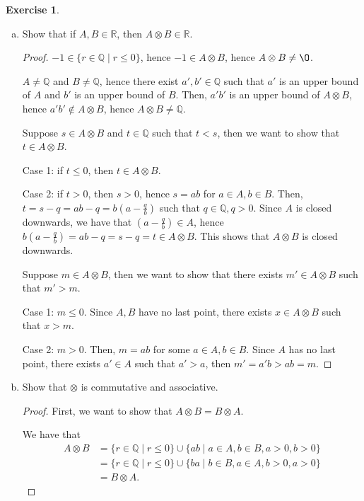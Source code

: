 \documentclass[11pt]{article}
\newcommand{\bbQ}{\mathbb{Q}}
\newcommand{\bbR}{\mathbb{R}}
\renewcommand{\emptyset}{\O}
\theoremstyle{definition}
\newtheorem{exercise}[theorem]{Exercise}
\numberwithin{equation}{subsection}
\begin{document}
\begin{exercise}
	\begin{enumerate}[(a)]
		\item Show that if $A, B \in \bbR$, then $A \otimes B \in \bbR$.
        
\begin{proof}
$-1 \in \{r \in \bbQ \mid r \leq 0\}$, hence $-1 \in A \otimes B$, hence $A \otimes B \neq \emptyset$.

$A\neq \bbQ$ and $B \neq \bbQ$, hence there exist $a',b' \in \bbQ$ such that $a'$ is an upper bound of $A$ and $b'$ is an upper bound of $B$. Then, $a'b'$ is an upper bound of $A \otimes B$, hence $a'b' \notin A \otimes B$, hence $A \otimes B \neq \bbQ$.

Suppose $s \in A \otimes B$ and $t\in \bbQ$ such that $t<s$, then we want to show that $t \in A\otimes B$.

Case 1: if $t\leq0$, then $t\in A \otimes B$.

Case 2: if $t>0$, then $s>0$, hence $s=ab$ for $a\in A, b\in B$. Then, $t=s-q=ab-q=b(a-\frac{q}{b})$ such that $q\in \bbQ, q >0$. Since $A$ is closed downwards, we have that $(a-\frac{q}{b})\in A$, hence $b(a-\frac{q}{b})=ab-q=s-q=t \in A\otimes B$. This shows that $A\otimes B$ is closed downwards.

Suppose $m \in A \otimes B$, then we want to show that there exists $m' \in A\otimes B$ such that $m'>m$.

Case 1: $m\leq 0$. Since $A,B$ have no last point, there exists $x \in A \otimes B$ such that $x>m$. 

Case 2: $m>0$. Then, $m=ab$ for some $a\in A, b\in B$. Since $A$ has no last point, there exists $a'\in A$ such that $a'>a$, then $m'=a'b>ab=m$. 

\renewcommand\qedsymbol{QED}
\end{proof}

		\item Show that $\otimes$ is commutative and associative. 
		        
\begin{proof}
First, we want to show that $A\otimes B=B \otimes A$. 

We have that \begin{align*}
            A\otimes B &= \{r\in\bbQ\mid r\leq 0\}\cup\{ab\mid a\in A,b\in B,a>0,b>0\}\\
            &= \{r\in\bbQ\mid r\leq 0\}\cup\{ba\mid b\in B,a\in A,b>0,a>0\}\\
            &= B\otimes A.
        \end{align*}


\end{proof}
\end{enumerate}
\end{exercise}
\end{document}
